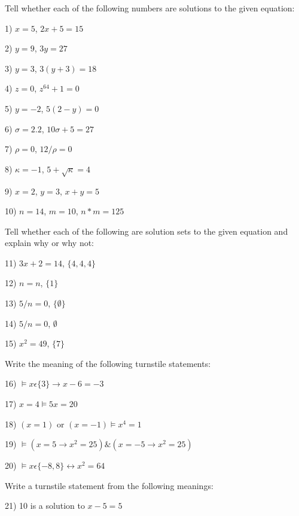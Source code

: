 \documentclass{book}
\theoremstyle{definition}
\begin{document}
Tell whether each of the following numbers are solutions to the given equation:

\vspace{3mm}

1) $x=5$, $2x+5=15$

2) $y=9$, $3y=27$

3) $y=3$, $3(y+3)=18$

4) $z=0$, $z^{64}+1=0$

5) $y=-2$, $5(2-y)=0$

6) $\sigma=2.2$, $10\sigma+5=27$

7) $\rho=0$, $12/\rho=0$

8) $\kappa=-1$, $5+\sqrt{\kappa}=4$

9) $x=2$, $y=3$, $x+y=5$

10) $n=14$, $m=10$, $n*m=125$

\vspace{5mm}

Tell whether each of the following are solution sets to the given equation and explain why or why not:

\vspace{3mm}

11) $3x+2=14$, $\{4,4,4\}$

12) $n=n$, $\{1\}$

13) $5/n=0$, $\{\emptyset\}$

14) $5/n=0$, $\emptyset$

15) $x^2=49$, $\{7\}$

\vspace{5mm}

Write the meaning of the following turnstile statements:

\vspace{3mm}

16)  $\vDash x\epsilon\{3\} \rightarrow x-6=-3$

17)  $x=4 \vDash 5x=20$

18)  $(x=1)$ or $(x=-1)  \vDash x^4=1$

19)  $\vDash (x=5 \rightarrow x^2=25) \& (x=-5 \rightarrow x^2=25)$

20)  $\vDash x\epsilon\{-8,8\} \leftrightarrow x^2=64$


\vspace{5mm}

Write a turnstile statement from the following meanings:

\vspace{3mm}

21) 10 is a solution to $x-5=5$
\end{document}
